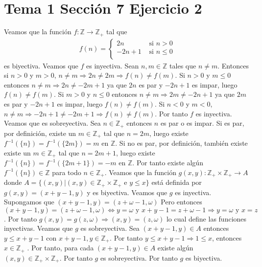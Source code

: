 \documentclass{article}
\begin{document}
\section{Tema 1 Sección 7 Ejercicio 2}
Veamos que la función $f: \mathbb{Z}\rightarrow \mathbb{Z}_{+} $ tal que
\begin{eqnarray}
f(n)=\begin{cases}
2n & \text{ si } n>0 \nonumber\\
-2n+1 & \text{ si } n\leq 0 \nonumber\\
\end{cases}
\end{eqnarray}
es biyectiva. Veamos que $f$ es inyectiva. Sean $n,m\in \mathbb {Z}$ tales que $n\neq m$. Entonces si $n>0$ y $m>0$, $n\neq m \Rightarrow 2n\neq 2m \Rightarrow f(n)\neq f(m)$. Si $n>0$ y $m\leq 0$ entonces $n\neq m \Rightarrow 2n\neq -2m+1 $  ya que $2n$ es par y $-2n+1$ es impar, luego $f(n)\neq f(m)$. Si $m>0$ y $n\leq 0$ entonces $n\neq m \Rightarrow 2m\neq -2n+1 $  ya que $2m$ es par y $-2n+1$ es impar, luego $f(n)\neq f(m)$. Si $n<0$ y $m<0$, $n\neq m \Rightarrow -2n+1\neq -2m+1 \Rightarrow f(n)\neq f(m)$. Por tanto $f$ es inyectiva. Veamos que es sobreyectiva. Sea $n\in \mathbb{Z}_{+}$ entonces $n$ es par o es impar. Si es par, por definición, existe un $m\in \mathbb{Z}_{+}$ tal que $n=2m$, luego existe $f^{-1} (\{n\})=f^{-1} (\{2m\})=m$ en $\mathbb{Z}$. Si no es par, por definición, también existe existe un $m\in\mathbb{Z}_{+}$ tal que $n=2m+1$, luego existe $f^{-1} (\{n\})=f^{-1} (\{2m+1\})=-m$ en $\mathbb{Z}$. Por tanto existe algún $f^{-1} (\{n\})\in\mathbb{Z}$ para todo $n\in \mathbb{Z}_{+}$.
\newline
Veamos que la función $g(x,y): \mathbb{Z}_{+}\times \mathbb{Z}_{+} \rightarrow A$ donde $A=\{(x,y)|(x,y)\in\mathbb{Z}_{+}\times \mathbb{Z}_{+}\text{ e } y\leq x\}$ está definida por $g(x,y)=(x+y-1,y)$ y es biyectiva. Veamos que $g$ es inyectiva. Supongamos que $(x+y-1,y)=(z+\omega-1,\omega)$ Pero entonces $(x+y-1,y)=(z+\omega-1,\omega)\Leftrightarrow y=\omega \text{ y } x+y-1=z+\omega-1\Rightarrow y=\omega \text{ y } x=z$. Por tanto $g(x,y)=g(z,\omega)\Rightarrow (x,y)=(z,\omega)$ lo cual define las funciones inyectivas. Veamos que $g$ es sobreyectiva. Sea $(x+y-1,y)\in A$ entonces $y\leq x+y-1$ con $x+y-1,y\in \mathbb{Z}_{+}$. Por tanto $y\leq x + y -1\Rightarrow  1 \leq x $, entonces $x\in\mathbb{Z}_{+}$ . Por tanto, para cada $(x+y-1,y)\in A$ existe algún $(x,y)\in \mathbb{Z}_{+}\times \mathbb{Z}_{+}$. Por tanto $g$ es sobreyectiva. Por tanto $g$ es biyectiva.
\newline
\end{document}

